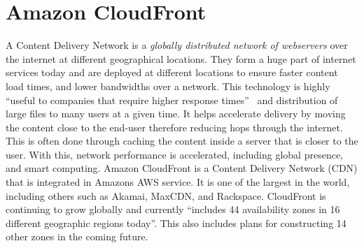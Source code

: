 \section{Amazon CloudFront}

A Content Delivery Network is a \emph{globally distributed network of
  webservers} \cite{hid-sp18-512-amazon-cloudfront-b} over the
internet at different geographical locations. They form a huge part of
internet services today and are deployed at different locations to
ensure faster content load times, and lower bandwidths over a
network. This technology is highly ``useful to companies that require
higher response times''~\cite{hid-sp18-512-amazon-cloudfront-b} and
distribution of large files to many users at a given time. It helps
accelerate delivery by moving the content close to the end-user
therefore reducing hops through the internet. This is often done
through caching the content inside a server that is closer to the
user. With this, network performance is accelerated, including global
presence, and smart computing. Amazon CloudFront is a Content Delivery
Network (CDN) that is integrated in Amazons AWS service. It is one of
the largest in the world, including others such as Akamai, MaxCDN, and
Rackspace. CloudFront is continuing to grow globally and currently
``includes 44 availability zones in 16 different geographic regions
today''\cite{hid-sp18-512-amazon-cloudfront-a}. This also includes
plans for constructing 14 other zones in the coming future.
